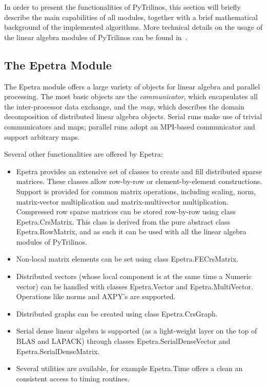 \documentclass[acmtocl]{acmtrans2m}
\begin{document}
In order to present the functionalities of PyTrilinos, this section
will briefly describe the main capabilities of all modules, together
with a brief mathematical background of the implemented algorithms.
More technical details on the usage of the linear algebra modules of
PyTrilinos can be found in~\cite{pytrilinos-la-guide}.

\subsection{The Epetra Module}
\label{subsec:epetra}

The Epetra module offers a large variety of objects for linear algebra
and parallel processing. The most basic objects are the {\sl
  communicator}, which encapsulates all the inter-processor data
exchange, and the {\sl map}, which describes the domain decomposition
of distributed linear algebra objects. Serial runs make use of trivial
communicators and maps; parallel runs adopt an MPI-based communicator
and support arbitrary maps.

Several other functionalities are offered by Epetra:

\begin{itemize}

\item Epetra provides an extensive set of classes to create and fill
  distributed sparse matrices. These classes allow row-by-row or
  element-by-element constructions. Support is provided for common
  matrix operations, including scaling, norm, matrix-vector
  multiplication and matrix-multivector multiplication.  Compressed
  row sparse matrices can be stored row-by-row using class
  Epetra.CrsMatrix. This class is derived from the pure abstract class
  Epetra.RowMatrix, and as such it can be used with all the linear
  algebra modules of PyTrilinos.

\item Non-local matrix elements can be set using class
  Epetra.FECrsMatrix.

\item Distributed vectors (whose local component is at the same time a
  Numeric vector) can be handled with classes Epetra.Vector and
  Epetra.MultiVector. Operations like norms and AXPY's are supported.

\item Distributed graphs can be created using class Epetra.CrsGraph.

\item Serial dense linear algebra is supported (as a light-weight
  layer on the top of BLAS and LAPACK) through classes
  Epetra.SerialDenseVector and Epetra.SerialDenseMatrix.

\item Several utilities are available, for example Epetra.Time offers
  a clean an consistent access to timing routines.

\end{itemize}
\end{document}
